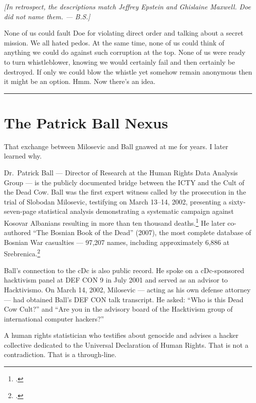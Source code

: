 \medskip\noindent\textit{[In retrospect, the descriptions match Jeffrey Epstein and Ghislaine Maxwell. Doe did not name them. --- B.S.]}

None of us could fault Doe for violating direct order and talking about a secret mission. We all hated pedos. At the same time, none of us could think of anything we could do against such corruption at the top. None of us were ready to turn whistleblower, knowing we would certainly fail and then certainly be destroyed. If only we could blow the whistle yet somehow remain anonymous then it might be an option. Hmm. Now there's an idea.

\vspace{1cm}\noindent\rule{0.5\textwidth}{0.5pt}\vspace{0.5cm}

\section*{The Patrick Ball Nexus}
\label{pos05:patrick-ball-nexus}

That exchange between Milosevic and Ball gnawed at me for years. I later learned why.

Dr.\ Patrick Ball --- Director of Research at the Human Rights Data Analysis Group --- is the publicly documented bridge between the ICTY and the Cult of the Dead Cow. Ball was the first expert witness called by the prosecution in the trial of Slobodan Milosevic, testifying on March 13--14, 2002, presenting a sixty-seven-page statistical analysis demonstrating a systematic campaign against Kosovar Albanians resulting in more than ten thousand deaths.\footcites{ballicty2002}{ictydecision} He later co-authored ``The Bosnian Book of the Dead'' (2007), the most complete database of Bosnian War casualties --- 97,207 names, including approximately 6,886 at Srebrenica.\footcite{foreignpolicy2012}

Ball's connection to the cDc is also public record. He spoke on a cDc-sponsored hacktivism panel at DEF CON 9 in July 2001 and served as an advisor to Hacktivismo. On March 14, 2002, Milosevic --- acting as his own defense attorney --- had obtained Ball's DEF CON talk transcript. He asked: ``Who is this Dead Cow Cult?'' and ``Are you in the advisory board of the Hacktivism group of international computer hackers?''

A human rights statistician who testifies about genocide and advises a hacker collective dedicated to the Universal Declaration of Human Rights. That is not a contradiction. That is a through-line.

